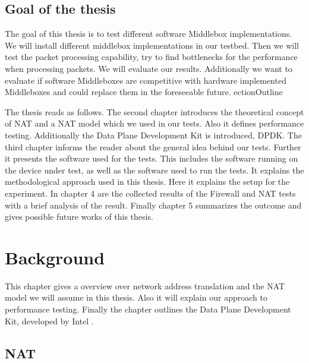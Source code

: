 \documentclass[11pt,a4paper,twoside,openright,bachelor,english]{netthesis}
\begin{document}
\section{Goal of the thesis}
The goal of this thesis is to test different software Middlebox implementations. We will install different middlebox implementations in our testbed. Then we will test the packet processing capability, try to find bottlenecks for the performance when processing packets. We will evaluate our results. 
Additionally we want to evaluate if software Middleboxes are competitive with hardware implemented Middleboxes and could replace them in the foreseeable future. 
ection{Outline}

The thesis reads as follows. The second chapter introduces the theoretical concept of NAT and a NAT model which we used in our tests. Also it defines performance testing. Additionally the Data Plane Development Kit is introduced, DPDK. The third chapter informs the reader about the general idea behind our tests. Further it presents the software used for the tests. This includes the software running on the device under test, as well as the software used to run the tests. It explains the methodological approach used in this thesis. Here it explains the setup for the experiment. In chapter 4 are the collected results of the Firewall and NAT tests with a brief analysis of the result. Finally chapter 5 summarizes the outcome and gives possible future works of this thesis. 

\chapter{Background}

This chapter gives a overview over network address translation and the NAT model we will assume in this thesis. Also it will explain our approach to performance testing. Finally the chapter outlines the Data Plane Development Kit, developed by Intel \cite{DPDKOv}.

\section{NAT}
\end{document}
